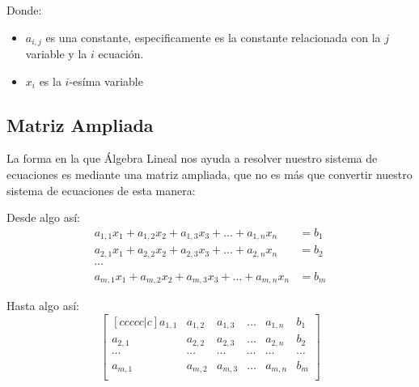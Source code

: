 \documentclass[12pt, fleqn]{report}                             %
\theoremstyle{break}                                            %
\begin{document}
                Donde:
                \begin{itemize}
                    \item $a_{i, j}$ es una constante, especificamente es la constante
                        relacionada con la $j$ variable y la $i$ ecuación.

                    \item $x_{i}$ es la $i$-esíma variable
                \end{itemize}


            \clearpage
            \subsection{Matriz Ampliada}
                La forma en la que Álgebra Lineal nos ayuda a resolver nuestro sistema de ecuaciones
                es mediante una matriz ampliada, que no es más que convertir nuestro sistema
                de ecuaciones de esta manera:

                Desde algo así:
                \begin{align*}
                    a_{1,1}x_1 + a_{1,2}x_2 + a_{1,3}x_3 + \dots + a_{1,n}x_n &= b_1    \\
                    a_{2,1}x_1 + a_{2,2}x_2 + a_{2,3}x_3 + \dots + a_{2,n}x_n &= b_2    \\
                    \cdots                                                              \\
                    a_{m,1}x_1 + a_{m,2}x_2 + a_{m,3}x_3 + \dots + a_{m,n}x_n &= b_m
                \end{align*}

                Hasta algo así:
                \begin{equation*}
                    \begin{bmatrix}[ccccc|c]
                        a_{1,1} & a_{1,2} & a_{1,3} & \dots  & a_{1,n} & b_1     \\
                        a_{2,1} & a_{2,2} & a_{2,3} & \dots  & a_{2,n} & b_2     \\
                        \cdots  & \cdots  & \cdots  & \cdots & \cdots  & \cdots  \\
                        a_{m,1} & a_{m,2} & a_{m,3} & \dots  & a_{m,n} & b_m     \\
                    \end{bmatrix}
                \end{equation*}
\end{document}

